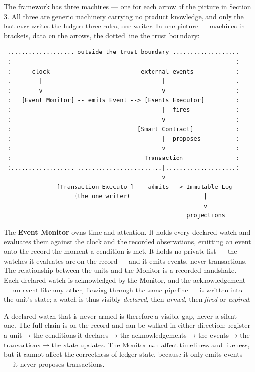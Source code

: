 \documentclass[11pt,a4paper]{article}
\newcommand{\clabel}[1]{\leavevmode\hypertarget{clause-#1}{}%
  \marginpar{\raggedright\scriptsize\ttfamily\textcolor{gray}{#1}}}
\begin{document}
\clabel{C-5.1}The framework has three machines --- one for each arrow of the picture
in Section 3. All three are generic machinery carrying no product
knowledge, and only the last ever writes the ledger: three roles, one
writer. In one picture --- machines in brackets, data on the arrows, the
dotted line the trust boundary:

\begin{verbatim}
 ................... outside the trust boundary ...................
 :                                                                :
 :      clock                          external events            :
 :        |                                  |                    :
 :        v                                  v                    :
 :   [Event Monitor] -- emits Event --> [Events Executor]         :
 :                                           |  fires             :
 :                                           v                    :
 :                                    [Smart Contract]            :
 :                                           |  proposes          :
 :                                           v                    :
 :                                      Transaction               :
 :...........................................|....................:
                                             v
               [Transaction Executor] -- admits --> Immutable Log
                    (the one writer)                     |
                                                         v
                                                    projections
\end{verbatim}

\clabel{C-5.2}The \textbf{Event Monitor} owns time and attention. It holds every
declared watch and evaluates them against the clock and the recorded
observations, emitting an event onto the record the moment a condition
is met. It holds no private list --- the watches it evaluates are on the
record --- and it emits events, never transactions. The relationship
between the units and the Monitor is a recorded handshake. Each declared
watch is acknowledged by the Monitor, and the acknowledgement --- an
event like any other, flowing through the same pipeline --- is written
into the unit's state; a watch is thus visibly \emph{declared}, then
\emph{armed}, then \emph{fired} or \emph{expired}.

\clabel{C-5.3}A declared watch that is never armed is therefore a visible gap, never a
silent one. The full chain is on the record and can be walked in either
direction: register a unit → the conditions it declares → the
acknowledgements → the events → the transactions → the state updates.
The Monitor can affect timeliness and liveness, but it cannot affect the
correctness of ledger state, because it only emits events --- it never
proposes transactions.
\end{document}
